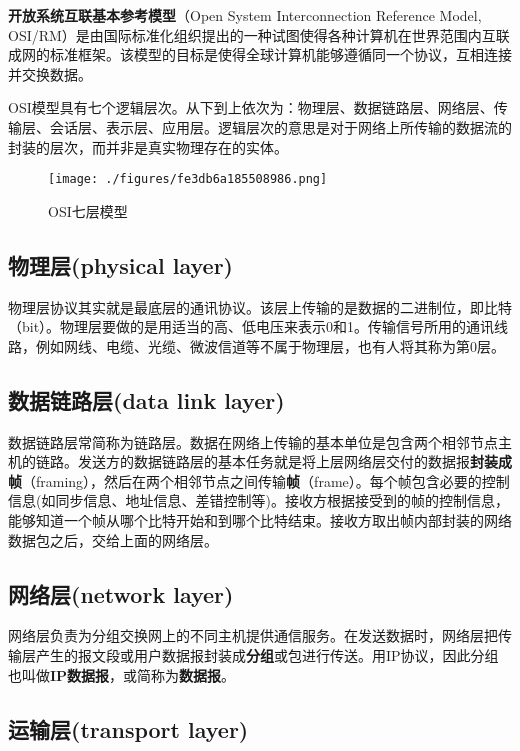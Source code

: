 
\textbf{开放系统互联基本参考模型}（Open System Interconnection Reference Model, OSI/RM）是由国际标准化组织提出的一种试图使得各种计算机在世界范围内互联成网的标准框架。该模型的目标是使得全球计算机能够遵循同一个协议，互相连接并交换数据。

OSI模型具有七个逻辑层次。从下到上依次为：物理层、数据链路层、网络层、传输层、会话层、表示层、应用层。逻辑层次的意思是对于网络上所传输的数据流的封装的层次，而并非是真实物理存在的实体。
\begin{figure}[ht]
\centering
\texttt{[image: ./figures/fe3db6a185508986.png]}
\caption{OSI七层模型} \label{fig_OSIRM_1}
\end{figure}

\subsection{物理层(physical layer)}

物理层协议其实就是最底层的通讯协议。该层上传输的是数据的二进制位，即比特（bit）。物理层要做的是用适当的高、低电压来表示0和1。传输信号所用的通讯线路，例如网线、电缆、光缆、微波信道等不属于物理层，也有人将其称为第0层。

\subsection{数据链路层(data link layer)}

数据链路层常简称为链路层。数据在网络上传输的基本单位是包含两个相邻节点主机的链路。发送方的数据链路层的基本任务就是将上层网络层交付的数据报\textbf{封装成帧}（framing），然后在两个相邻节点之间传输\textbf{帧}（frame）。每个帧包含必要的控制信息(如同步信息、地址信息、差错控制等)。接收方根据接受到的帧的控制信息，能够知道一个帧从哪个比特开始和到哪个比特结束。接收方取出帧内部封装的网络数据包之后，交给上面的网络层。

\subsection{网络层(network layer)}
网络层负责为分组交换网上的不同主机提供通信服务。在发送数据时，网络层把传输层产生的报文段或用户数据报封装成\textbf{分组}或包进行传送。用IP协议，因此分组也叫做\textbf{IP数据报}，或简称为\textbf{数据报}。

\subsection{运输层(transport layer)}

